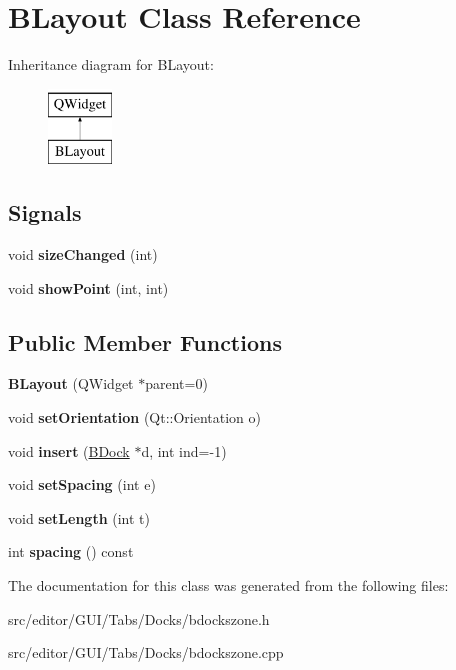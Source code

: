 \hypertarget{class_b_layout}{}\section{B\+Layout Class Reference}
\label{class_b_layout}
Inheritance diagram for B\+Layout\+:\begin{figure}[H]
\begin{center}
\leavevmode
\includegraphics[height=2.000000cm]{class_b_layout}
\end{center}
\end{figure}
\subsection*{Signals}
\begin{DoxyCompactItemize}
\item 
\hypertarget{class_b_layout_a9e27eb42d23daea4491e31dc65cde9bd}{}\label{class_b_layout_a9e27eb42d23daea4491e31dc65cde9bd} 
void {\bfseries size\+Changed} (int)
\item 
\hypertarget{class_b_layout_aa9926a76425a6fdc89131feec134444b}{}\label{class_b_layout_aa9926a76425a6fdc89131feec134444b} 
void {\bfseries show\+Point} (int, int)
\end{DoxyCompactItemize}
\subsection*{Public Member Functions}
\begin{DoxyCompactItemize}
\item 
\hypertarget{class_b_layout_aaa40bac25828f412e0c9f0295143222a}{}\label{class_b_layout_aaa40bac25828f412e0c9f0295143222a} 
{\bfseries B\+Layout} (Q\+Widget $\ast$parent=0)
\item 
\hypertarget{class_b_layout_a15af3c6623f5e820b011a237bd896fa5}{}\label{class_b_layout_a15af3c6623f5e820b011a237bd896fa5} 
void {\bfseries set\+Orientation} (Qt\+::\+Orientation o)
\item 
\hypertarget{class_b_layout_ad950c8e9f332986e6367081528de88d6}{}\label{class_b_layout_ad950c8e9f332986e6367081528de88d6} 
void {\bfseries insert} (\hyperlink{class_b_dock}{B\+Dock} $\ast$d, int ind=-\/1)
\item 
\hypertarget{class_b_layout_a2c129fc7bb433119b460eceac0540f85}{}\label{class_b_layout_a2c129fc7bb433119b460eceac0540f85} 
void {\bfseries set\+Spacing} (int e)
\item 
\hypertarget{class_b_layout_a59a4b4faeeac67c8260f4dd302ff3a66}{}\label{class_b_layout_a59a4b4faeeac67c8260f4dd302ff3a66} 
void {\bfseries set\+Length} (int t)
\item 
\hypertarget{class_b_layout_ad07b013bbf58871889874b5cdf835eb6}{}\label{class_b_layout_ad07b013bbf58871889874b5cdf835eb6} 
int {\bfseries spacing} () const
\end{DoxyCompactItemize}


The documentation for this class was generated from the following files\+:\begin{DoxyCompactItemize}
\item 
src/editor/\+G\+U\+I/\+Tabs/\+Docks/bdockszone.\+h\item 
src/editor/\+G\+U\+I/\+Tabs/\+Docks/bdockszone.\+cpp\end{DoxyCompactItemize}
